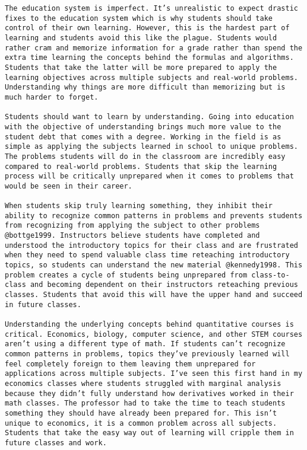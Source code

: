 \documentclass[11pt,]{article}
\begin{document}
\begin{verbatim}
The education system is imperfect. It’s unrealistic to expect drastic fixes to the education system which is why students should take control of their own learning. However, this is the hardest part of learning and students avoid this like the plague. Students would rather cram and memorize information for a grade rather than spend the extra time learning the concepts behind the formulas and algorithms. Students that take the latter will be more prepared to apply the learning objectives across multiple subjects and real-world problems. Understanding why things are more difficult than memorizing but is much harder to forget. 

Students should want to learn by understanding. Going into education with the objective of understanding brings much more value to the student debt that comes with a degree. Working in the field is as simple as applying the subjects learned in school to unique problems. The problems students will do in the classroom are incredibly easy compared to real-world problems. Students that skip the learning process will be critically unprepared when it comes to problems that would be seen in their career.  

When students skip truly learning something, they inhibit their ability to recognize common patterns in problems and prevents students from recognizing from applying the subject to other problems @bottge1999. Instructors believe students have completed and understood the introductory topics for their class and are frustrated when they need to spend valuable class time reteaching introductory topics, so students can understand the new material @kennedy1998. This problem creates a cycle of students being unprepared from class-to-class and becoming dependent on their instructors reteaching previous classes. Students that avoid this will have the upper hand and succeed in future classes.

Understanding the underlying concepts behind quantitative courses is critical. Economics, biology, computer science, and other STEM courses aren’t using a different type of math. If students can’t recognize common patterns in problems, topics they’ve previously learned will feel completely foreign to them leaving them unprepared for applications across multiple subjects. I’ve seen this first hand in my economics classes where students struggled with marginal analysis because they didn’t fully understand how derivatives worked in their math classes. The professor had to take the time to teach students something they should have already been prepared for. This isn’t unique to economics, it is a common problem across all subjects. Students that take the easy way out of learning will cripple them in future classes and work. 


\end{verbatim}
\end{document}
